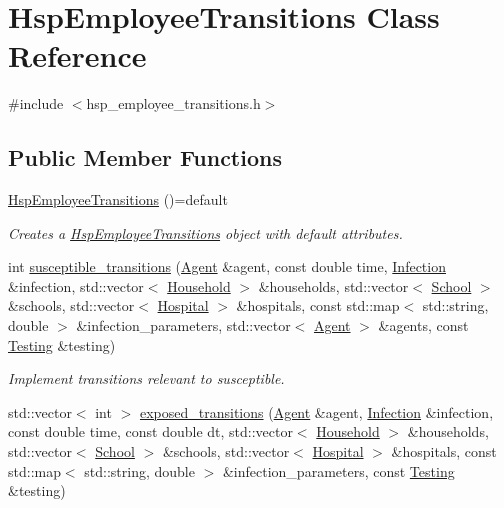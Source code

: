 \hypertarget{classHspEmployeeTransitions}{}\section{Hsp\+Employee\+Transitions Class Reference}
\label{classHspEmployeeTransitions}


{\ttfamily \#include $<$hsp\+\_\+employee\+\_\+transitions.\+h$>$}

\subsection*{Public Member Functions}
\begin{DoxyCompactItemize}
\item 
\hyperlink{classHspEmployeeTransitions_ad576fd4585e25c7cfce54de937321dbd}{Hsp\+Employee\+Transitions} ()=default
\begin{DoxyCompactList}\small\item\em Creates a \hyperlink{classHspEmployeeTransitions}{Hsp\+Employee\+Transitions} object with default attributes. \end{DoxyCompactList}\item 
int \hyperlink{classHspEmployeeTransitions_a9a514d0c8b5212bd9f6ea05fc25d2498}{susceptible\+\_\+transitions} (\hyperlink{classAgent}{Agent} \&agent, const double time, \hyperlink{classInfection}{Infection} \&infection, std\+::vector$<$ \hyperlink{classHousehold}{Household} $>$ \&households, std\+::vector$<$ \hyperlink{classSchool}{School} $>$ \&schools, std\+::vector$<$ \hyperlink{classHospital}{Hospital} $>$ \&hospitals, const std\+::map$<$ std\+::string, double $>$ \&infection\+\_\+parameters, std\+::vector$<$ \hyperlink{classAgent}{Agent} $>$ \&agents, const \hyperlink{classTesting}{Testing} \&testing)
\begin{DoxyCompactList}\small\item\em Implement transitions relevant to susceptible. \end{DoxyCompactList}\item 
std\+::vector$<$ int $>$ \hyperlink{classHspEmployeeTransitions_a1d046fe275f90ab477f31f8c0707fe16}{exposed\+\_\+transitions} (\hyperlink{classAgent}{Agent} \&agent, \hyperlink{classInfection}{Infection} \&infection, const double time, const double dt, std\+::vector$<$ \hyperlink{classHousehold}{Household} $>$ \&households, std\+::vector$<$ \hyperlink{classSchool}{School} $>$ \&schools, std\+::vector$<$ \hyperlink{classHospital}{Hospital} $>$ \&hospitals, const std\+::map$<$ std\+::string, double $>$ \&infection\+\_\+parameters, const \hyperlink{classTesting}{Testing} \&testing)

\end{DoxyCompactItemize}
